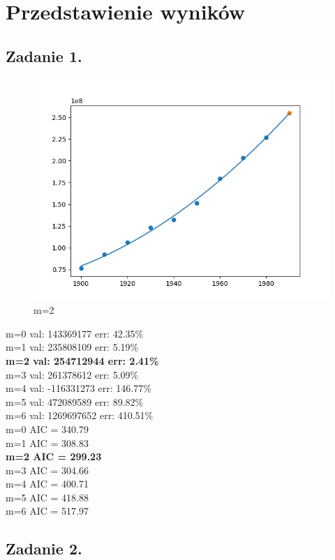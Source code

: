 \documentclass[11pt]{scrartcl}
\begin{document}
    \section{Przedstawienie wyników}
    \subsection{Zadanie 1.}
    \begin{figure}[H]
        \centering
        \includegraphics[width=0.8\linewidth]{approx.png}
        \caption{m=2}
    \end{figure}

    m=0 val: 143369177 err: 42.35\% \\
    m=1 val: 235808109 err: 5.19\% \\
    \textbf{m=2 val: 254712944 err: 2.41\%} \\
    m=3 val: 261378612 err: 5.09\%\ \\
    m=4 val: -116331273 err: 146.77\% \\
    m=5 val: 472089589 err: 89.82\% \\
    m=6 val: 1269697652 err: 410.51\% \\
    m=0 AIC = 340.79 \\
    m=1 AIC = 308.83 \\
    \textbf{m=2 AIC = 299.23} \\
    m=3 AIC = 304.66 \\
    m=4 AIC = 400.71 \\
    m=5 AIC = 418.88 \\
    m=6 AIC = 517.97

    \subsection{Zadanie 2.}
\end{document}
